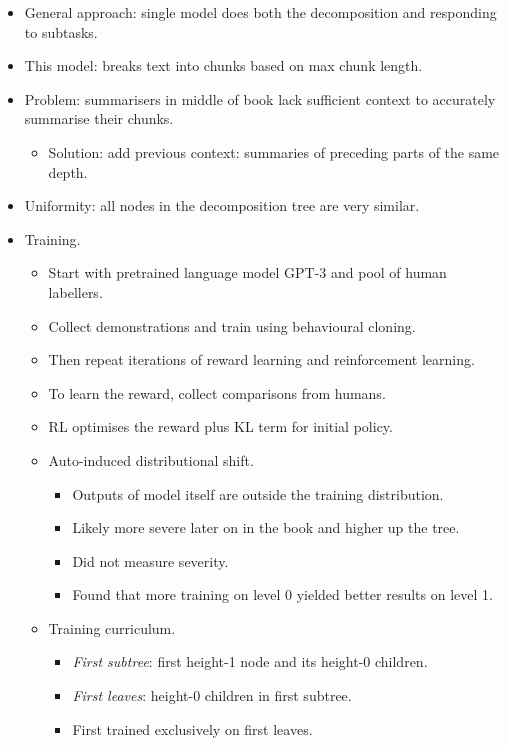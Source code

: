 \begin{itemize}
    \item General approach: single model does both the decomposition and responding to subtasks.
    \item This model: breaks text into chunks based on max chunk length.
    \item Problem: summarisers in middle of book lack sufficient context to accurately summarise their chunks.
    \begin{itemize}
        \item Solution: add previous context: summaries of preceding parts of the same depth.
    \end{itemize}
    \item Uniformity: all nodes in the decomposition tree are very similar.
    \item Training.
    \begin{itemize}
        \item Start with pretrained language model GPT-3 and pool of human labellers.
        \item Collect demonstrations and train using behavioural cloning.
        \item Then repeat iterations of reward learning and reinforcement learning.
        \item To learn the reward, collect comparisons from humans.
        \item RL optimises the reward plus KL term for initial policy.
        \item Auto-induced distributional shift.
        \begin{itemize}
            \item Outputs of model itself are outside the training distribution.
            \item Likely more severe later on in the book and higher up the tree.
            \item Did not measure severity.
            \item Found that more training on level 0 yielded better results on level 1.
        \end{itemize}
        \item Training curriculum.
        \begin{itemize}
            \item \emph{First subtree}: first height-1 node and its height-0 children.
            \item \emph{First leaves}: height-0 children in first subtree.
            \item First trained exclusively on first leaves.

\end{itemize}
\end{itemize}
\end{itemize}
